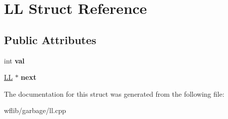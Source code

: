 \hypertarget{struct_l_l}{\section{L\-L Struct Reference}
\label{struct_l_l}
}
\subsection*{Public Attributes}
\begin{DoxyCompactItemize}
\item 
\hypertarget{struct_l_l_a47b73fd1600a7036b91f511b59db510e}{int {\bfseries val}}\label{struct_l_l_a47b73fd1600a7036b91f511b59db510e}

\item 
\hypertarget{struct_l_l_a53c7e943774463ba53e701f0eb2a18b3}{\hyperlink{struct_l_l}{L\-L} $\ast$ {\bfseries next}}\label{struct_l_l_a53c7e943774463ba53e701f0eb2a18b3}

\end{DoxyCompactItemize}


The documentation for this struct was generated from the following file\-:\begin{DoxyCompactItemize}
\item 
wflib/garbage/ll.\-cpp\end{DoxyCompactItemize}
